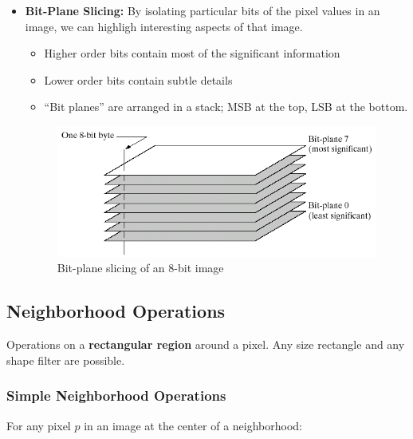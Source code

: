 \begin{itemize}
  \item \textbf{Bit-Plane Slicing:} By isolating particular bits of
    the pixel values in an image, we can highligh interesting aspects
    of that image.
    \begin{itemize}
      \item Higher order bits contain most of the significant information
      \item Lower order bits contain subtle details
      \item \enquote{Bit planes} are arranged in a stack; MSB at the
        top, LSB at the bottom.
    \end{itemize}

    \begin{minipage}{\linewidth}
      \begin{figure}[H]
        \centering
        \includegraphics[width=\linewidth]{images/bit_plane_slicing.png}
        \caption{Bit-plane slicing of an 8-bit image}
      \end{figure}
      \vspace{-0.5cm}
    \end{minipage}

\end{itemize}

\subsection*{Neighborhood Operations}

Operations on a \textbf{rectangular region} around a pixel. Any size
rectangle and any shape filter are possible.

\subsubsection*{Simple Neighborhood Operations}

For any pixel $p$ in an image at the center of a neighborhood:

